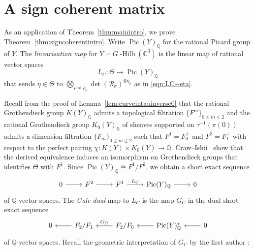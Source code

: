 \documentclass[11pt,reqno]{amsart}
\numberwithin{equation}{section}
\theoremstyle{definition}
\newcommand{\QQ}{\ensuremath{\mathbb{Q}}}
\newcommand{\ghilb}{\ensuremath{G}\operatorname{-Hilb}}
\newcommand{\0}{\operatorname{0}}
\newcommand{\Pic}{\operatorname{Pic}}
\begin{document}
\section{A sign coherent matrix}
\label{sec:signcoherent}
 As an application of Theorem~\ref{thm:mainintro}, we prove Theorem~\ref{thm:signcoherentintro}.  
 Write $\Pic(Y)_{\mathbb{Q}}$
  for the rational Picard group of $Y$. The \emph{linearisation map} for $Y=\ghilb(\mathbb{C}^3)$ is the linear map of rational vector spaces
  \begin{equation}
      \label{eqn:linearisation}
   L_C\colon \Theta\longrightarrow \Pic(Y)_{\mathbb{Q}}
  \end{equation}
   that sends $\eta\in \Theta$ to $\bigotimes_{\rho\neq \rho_0} \det(\mathcal{R}_\sigma)^{\otimes \eta_\sigma}$ as in \eqref{eqn:LC+eta}. 

   Recall from the proof of Lemma~\ref{lem:curveintauinverse0} that the rational Grothendieck group $K(Y)_{\mathbb{Q}}$ admits a topological filtration $\{F^m\}_{0\leq m\leq 2}$ and the rational Grothendieck group $K_0(Y)_{\mathbb{Q}}$ of sheaves supported on $\tau^{-1}(\pi(0))$ admits a dimension filtration $\{F_m\}_{0\leq m\leq 2}$ such that $F^1=F_0^\perp$ and $F^2=F_1^\perp$ with respect to the perfect pairing $\chi\colon K(Y)\times K_0(Y)\to \QQ$. Craw--Ishii~\cite[Corollary~5.2]{CI04} show that the derived equivalence induces an isomorphism on Grothendieck groups that identifies $\Theta$ with $F^1$. Since $\Pic(Y)_{\mathbb{Q}}\cong F^1/F^2$,  we obtain a short exact sequence
       \begin{equation}
       \label{eqn:sesPic}
 \begin{tikzcd}
 0\ar[r] & F^2\ar[r] & F^1\ar[r,"L_C"] & \Pic(Y)_{\QQ}\ar[r] & 0
  \end{tikzcd}
  \end{equation}
of $\QQ$-vector spaces.  The \emph{Gale dual} map to $L_C$ is the map $G_C$ in the dual short exact sequence 
      \begin{equation}
 \begin{tikzcd}
   \label{eqn:sesPicdual}
 0 & F_2/F_1\ar[l] & F_2/F_0\ar[l,swap,"G_C"] & \Pic(Y)_{\QQ}^*\ar[l] & 0\ar[l]
  \end{tikzcd}
  \end{equation}
of $\QQ$-vector spaces. Recall the geometric interpretation of $G_C$ by the first author \cite[Theorem~1.1]{C21}:
   
\end{document}
